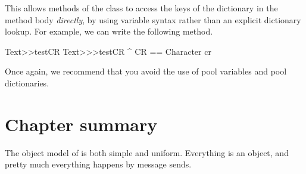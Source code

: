\documentclass[a4paper,10pt,twoside]{book}
\begin{document}
This allows methods of the class  to access the keys of the dictionary in the method body \emph{directly}, \ie by using variable syntax rather than an explicit dictionary lookup.
For example, we can write the following method. 
  
\begin{method}[texttestcr]{Text>>testCR}
Text>>>testCR 	
      ^ CR == Character cr
\end{method}

Once again,  we recommend that you avoid the use of pool variables and pool dictionaries. 

\section{Chapter summary}

The object model of \squeak is both simple and uniform.
Everything is an object, and pretty much everything happens by message sends.
\end{document}
